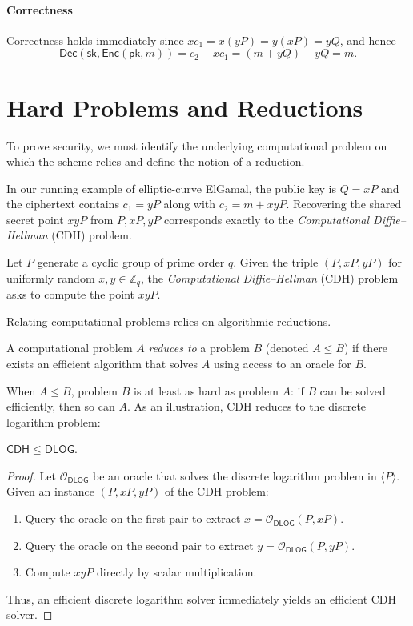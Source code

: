 \paragraph*{Correctness}
Correctness holds immediately since \(x c_1 = x (yP) = y (xP) = y Q\), and hence
\[
    \mathsf{Dec}(\mathsf{sk}, \mathsf{Enc}(\mathsf{pk}, m)) = c_2 - x c_1 = (m + y Q) - y Q = m.
\]

\section*{Hard Problems and Reductions}

To prove security, we must identify the underlying computational problem on which the scheme relies and define the notion of a reduction.

In our running example of elliptic-curve ElGamal, the public key is \(Q = xP\) and the ciphertext contains \(c_1 = yP\) along with \(c_2 = m + xyP\).
Recovering the shared secret point \(xyP\) from \(P, xP, yP\) corresponds exactly to the \emph{Computational Diffie--Hellman} (CDH) problem.

\begin{definition}
    Let \(P\) generate a cyclic group of prime order \(q\).
    Given the triple \((P, xP, yP)\) for uniformly random \(x, y \in \mathbb{Z}_q\), the \emph{Computational Diffie--Hellman} (CDH) problem asks to compute the point \(xyP\).
\end{definition}

Relating computational problems relies on algorithmic reductions.

\begin{definition}[Reduction]
    A computational problem \(A\) \emph{reduces to} a problem \(B\) (denoted \(A \le B\)) if there exists an efficient algorithm that solves \(A\) using access to an oracle for \(B\).
\end{definition}

When \(A \le B\), problem \(B\) is at least as hard as problem \(A\): if \(B\) can be solved efficiently, then so can \(A\).
As an illustration, CDH reduces to the discrete logarithm problem:

\begin{proposition}
    \(\mathsf{CDH} \le \mathsf{DLOG}\).
\end{proposition}
\begin{proof}
    Let \(\mathcal{O}_{\mathsf{DLOG}}\) be an oracle that solves the discrete logarithm problem in \(\langle P \rangle\).
    Given an instance \((P, xP, yP)\) of the CDH problem:
    \begin{enumerate}
        \item Query the oracle on the first pair to extract \(x = \mathcal{O}_{\mathsf{DLOG}}(P, xP)\).
        \item Query the oracle on the second pair to extract \(y = \mathcal{O}_{\mathsf{DLOG}}(P, yP)\).
        \item Compute \(xyP\) directly by scalar multiplication.
    \end{enumerate}
    Thus, an efficient discrete logarithm solver immediately yields an efficient CDH solver.
\end{proof}

